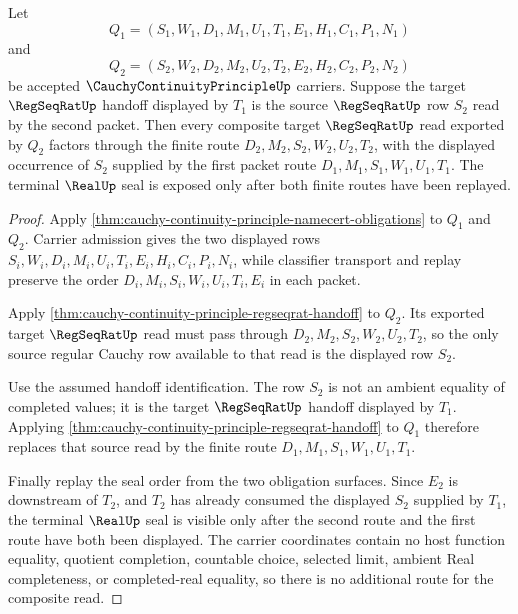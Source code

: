 \begin{theorem}
\label{thm:cauchy-continuity-principle-modulus-composition-handoff}
Let
$$
Q_1=(S_1,W_1,D_1,M_1,U_1,T_1,E_1,H_1,C_1,P_1,N_1)
$$
and
$$
Q_2=(S_2,W_2,D_2,M_2,U_2,T_2,E_2,H_2,C_2,P_2,N_2)
$$
be accepted $\CauchyContinuityPrincipleUp$ carriers. Suppose the target $\RegSeqRatUp$ handoff displayed by $T_1$ is the source $\RegSeqRatUp$ row $S_2$ read by the second packet. Then every composite target $\RegSeqRatUp$ read exported by $Q_2$ factors through the finite route $D_2,M_2,S_2,W_2,U_2,T_2$, with the displayed occurrence of $S_2$ supplied by the first packet route $D_1,M_1,S_1,W_1,U_1,T_1$. The terminal $\RealUp$ seal is exposed only after both finite routes have been replayed.
\end{theorem}
\begin{proof}
Apply \autoref{thm:cauchy-continuity-principle-namecert-obligations} to $Q_1$ and $Q_2$. Carrier admission gives the two displayed rows $S_i,W_i,D_i,M_i,U_i,T_i,E_i,H_i,C_i,P_i,N_i$, while classifier transport and replay preserve the order $D_i,M_i,S_i,W_i,U_i,T_i,E_i$ in each packet.

Apply \autoref{thm:cauchy-continuity-principle-regseqrat-handoff} to $Q_2$. Its exported target $\RegSeqRatUp$ read must pass through $D_2,M_2,S_2,W_2,U_2,T_2$, so the only source regular Cauchy row available to that read is the displayed row $S_2$.

Use the assumed handoff identification. The row $S_2$ is not an ambient equality of completed values; it is the target $\RegSeqRatUp$ handoff displayed by $T_1$. Applying \autoref{thm:cauchy-continuity-principle-regseqrat-handoff} to $Q_1$ therefore replaces that source read by the finite route $D_1,M_1,S_1,W_1,U_1,T_1$.

Finally replay the seal order from the two obligation surfaces. Since $E_2$ is downstream of $T_2$, and $T_2$ has already consumed the displayed $S_2$ supplied by $T_1$, the terminal $\RealUp$ seal is visible only after the second route and the first route have both been displayed. The carrier coordinates contain no host function equality, quotient completion, countable choice, selected limit, ambient Real completeness, or completed-real equality, so there is no additional route for the composite read.
\end{proof}

